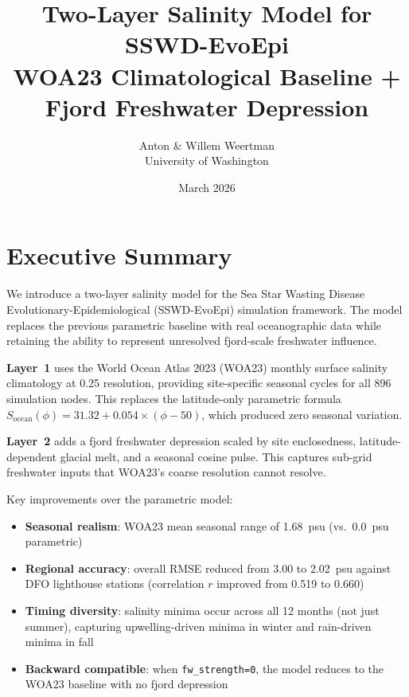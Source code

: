 \documentclass[11pt,letterpaper]{article}
\title{
    \vspace{-1cm}
    \textbf{Two-Layer Salinity Model for SSWD-EvoEpi}\\[0.3em]
    \large WOA23 Climatological Baseline + Fjord Freshwater Depression
}
\author{
    Anton \& Willem Weertman\\
    \small University of Washington
}
\date{March 2026}
\begin{document}
\maketitle
\thispagestyle{fancy}

\section{Executive Summary}

We introduce a two-layer salinity model for the Sea Star Wasting Disease
Evolutionary-Epidemiological (SSWD-EvoEpi) simulation framework.
The model replaces the previous parametric baseline with real oceanographic
data while retaining the ability to represent unresolved fjord-scale
freshwater influence.

\textbf{Layer~1} uses the World Ocean Atlas 2023 (WOA23) monthly surface
salinity climatology at 0.25\textdegree{} resolution, providing
site-specific seasonal cycles for all 896 simulation nodes. This replaces
the latitude-only parametric formula
$S_\mathrm{ocean}(\phi) = 31.32 + 0.054 \times (\phi - 50)$, which
produced zero seasonal variation.

\textbf{Layer~2} adds a fjord freshwater depression scaled by site
enclosedness, latitude-dependent glacial melt, and a seasonal cosine
pulse. This captures sub-grid freshwater inputs that WOA23's coarse
resolution cannot resolve.

Key improvements over the parametric model:
\begin{itemize}[nosep]
    \item \textbf{Seasonal realism}: WOA23 mean seasonal range of 1.68~psu
          (vs.\ 0.0~psu parametric)
    \item \textbf{Regional accuracy}: overall RMSE reduced from 3.00 to
          2.02~psu against DFO lighthouse stations (correlation $r$ improved
          from 0.519 to 0.660)
    \item \textbf{Timing diversity}: salinity minima occur across all 12
          months (not just summer), capturing upwelling-driven minima in
          winter and rain-driven minima in fall
    \item \textbf{Backward compatible}: when \texttt{fw\_strength=0}, the
          model reduces to the WOA23 baseline with no fjord depression
\end{itemize}
\end{document}
